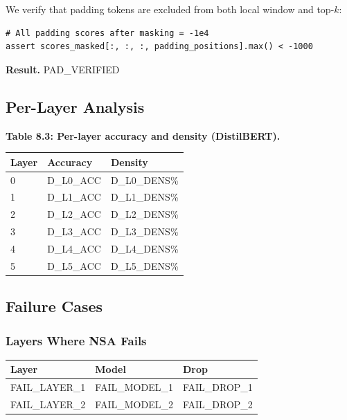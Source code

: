 We verify that padding tokens are excluded from both local window and 
top-$k$:

\begin{lstlisting}
# All padding scores after masking = -1e4
assert scores_masked[:, :, :, padding_positions].max() < -1000
\end{lstlisting}

\textbf{Result.} {{PAD\_VERIFIED}}

\subsection{Per-Layer Analysis}

\textbf{Table 8.3: Per-layer accuracy and density (DistilBERT).}

\begin{table}[H]
\centering
\small
\begin{tabular}{lll}
\toprule
\textbf{Layer} & \textbf{Accuracy} & \textbf{Density} \\
\midrule
0 & {{D\_L0\_ACC}} & {{D\_L0\_DENS}}\% \\
1 & {{D\_L1\_ACC}} & {{D\_L1\_DENS}}\% \\
2 & {{D\_L2\_ACC}} & {{D\_L2\_DENS}}\% \\
3 & {{D\_L3\_ACC}} & {{D\_L3\_DENS}}\% \\
4 & {{D\_L4\_ACC}} & {{D\_L4\_DENS}}\% \\
5 & {{D\_L5\_ACC}} & {{D\_L5\_DENS}}\% \\
\bottomrule
\end{tabular}
\end{table}

\subsection{Failure Cases}

\subsubsection{Layers Where NSA Fails}

\begin{table}[H]
\centering
\small
\begin{tabular}{lll}
\toprule
\textbf{Layer} & \textbf{Model} & \textbf{Drop} \\
\midrule
{{FAIL\_LAYER\_1}} & {{FAIL\_MODEL\_1}} & {{FAIL\_DROP\_1}} \\
{{FAIL\_LAYER\_2}} & {{FAIL\_MODEL\_2}} & {{FAIL\_DROP\_2}} \\
\bottomrule
\end{tabular}
\end{table}


